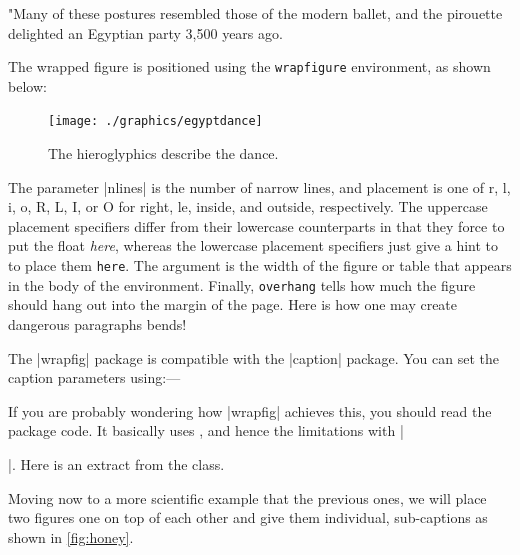 "Many of these postures resembled those of the modern ballet, and the pirouette delighted an Egyptian party 3,500 years ago.
\medskip

The wrapped figure is positioned using the \texttt{wrapfigure} environment, as shown below:

\begin{teX}
\begin{figure}
   \texttt{[image: ./graphics/egyptdance]} 
   \caption{\small The hieroglyphics describe the dance.}
\end{figure}
\end{teX}

The parameter |nlines|  is the number of narrow lines, and placement is one of r, l, i, o, R, L, I, or
O for right, le, inside, and outside, respectively. The uppercase placement specifiers
differ from their lowercase counterparts in that they force \latex to put the float \emph{here},
whereas the lowercase placement specifiers just give a hint to \latex to place them
\texttt{here}. The  argument is the width of the figure or table that appears in the body
of the environment. Finally, \texttt{overhang} tells \latex how much the figure should hang out
into the margin of the page. Here is how one may create dangerous paragraphs bends!

The |wrapfig| package is compatible with the |caption| package. You can set the caption parameters using:---

\begin{teX}
\captionsetup[wrapfigure]{<options>}
\end{teX}

If you are probably wondering how |wrapfig| achieves this, you should read the package code. It basically uses , and hence the limitations with |\par|. Here is an extract from the class.

\begin{teX}

\def\WF@startfloating{%
 \WF@everypar\expandafter{\the\everypar}\let\everypar\WF@everypar
 \WF@@everypar{\ifvoid\WF@box\else\WF@floathand\fi \the\everypar
 \WF@wraphand
}}
\end{teX}

Moving now to a more scientific example that the previous ones, we will place two figures
one on top of each other and give them individual, sub-captions as shown in \ref{fig:honey}.
 
